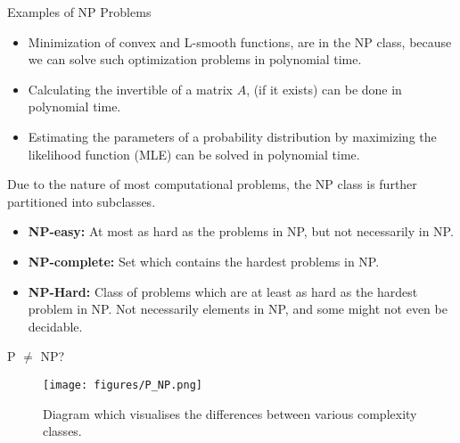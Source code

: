 \documentclass[aspectratio=169,xcolor=dvipsnames, t]{beamer}
\begin{document}
\begin{frame}{Examples of NP Problems}
	\vspace{-5mm}
	\begin{itemize}
		\item<2-> Minimization of convex and L-smooth functions, are in the NP class, because we can solve such optimization problems in polynomial time.
		\item<3-> Calculating the invertible of a matrix \( A \), (if it exists) can be done in polynomial time.
		\item<4-> Estimating the parameters of a probability distribution by maximizing the likelihood function (MLE) can be solved in polynomial time.
	\end{itemize}

	Due to the nature of most computational problems, the NP class is further partitioned into subclasses.
	\begin{itemize}
		\item<6-> \textbf{NP-easy:} At most as hard as the problems in NP, but not necessarily in NP.
		\item<7-> \textbf{NP-complete:} Set which contains the hardest problems in NP.
		\item<8-> \textbf{NP-Hard:} Class of problems which are at least as hard as the hardest problem in NP. Not necessarily elements in NP, and some might not even be decidable.
	\end{itemize}
\end{frame}

\begin{frame}{P \( \neq \) NP?}
	\vspace{-5mm}
	\begin{figure}
		\texttt{[image: figures/P\_NP.png]}
		\caption{Diagram which visualises the differences between various complexity classes.}
	\end{figure}
\end{frame}
\end{document}
